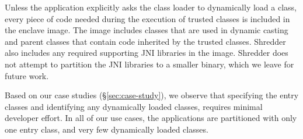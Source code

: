 Unless the application explicitly asks the class loader to
dynamically load a class,
every piece of code needed during the execution of trusted classes
is included in the enclave image.
The image includes classes that are used in dynamic casting and parent classes 
that contain code inherited by the trusted classes.
Shredder also includes any required supporting JNI libraries in the image.
Shredder does not attempt to partition the JNI libraries to a smaller binary,
which we leave for future work.




Based on our case studies (\S\ref{sec:case-study}),
we observe that specifying the entry classes and identifying any dynamically loaded classes,
requires minimal developer effort.
In all of our use cases, the applications are partitioned with only one entry class, and very few dynamically loaded classes.



